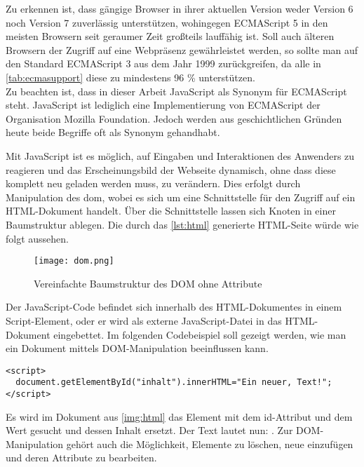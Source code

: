 Zu erkennen ist, dass gängige Browser in ihrer aktuellen Version weder Version 6 noch Version 7 zuverlässig unterstützen, wohingegen ECMAScript 5 in den meisten Browsern seit geraumer Zeit großteils lauffähig ist. Soll auch älteren Browsern der Zugriff auf eine Webpräsenz gewährleistet werden, so sollte man auf den Standard ECMAScript 3 aus dem Jahr 1999 zurückgreifen, da alle in \autoref{tab:ecmasupport} diese zu mindestens 96 \% unterstützen.\\
Zu beachten ist, dass in dieser Arbeit JavaScript als Synonym für ECMAScript steht. JavaScript ist lediglich eine Implementierung von ECMAScript der Organisation Mozilla Foundation. Jedoch werden aus geschichtlichen Gründen heute beide Begriffe oft als Synonym gehandhabt.

Mit JavaScript ist es möglich, auf Eingaben und Interaktionen des Anwenders zu reagieren und das Erscheinungsbild der Webseite dynamisch, ohne dass diese komplett neu geladen werden muss, zu verändern. Dies erfolgt durch Manipulation des \ac{dom}, wobei es sich um eine Schnittstelle für den Zugriff auf ein HTML-Dokument handelt. Über die Schnittstelle lassen sich Knoten in einer Baumstruktur ablegen. Die durch das \autoref{lst:html} generierte HTML-Seite würde wie folgt aussehen.
\begin{figure}[H]
    \begin{center}
        \texttt{[image: dom.png]}
        \caption{Vereinfachte Baumstruktur des DOM ohne Attribute}
        \label{img:dom}
    \end{center}
\end{figure}

Der JavaScript-Code befindet sich innerhalb des HTML-Dokumentes in einem Script-Element, oder er wird als externe JavaScript-Datei in das HTML-Dokument eingebettet. Im folgenden Codebeispiel soll gezeigt werden, wie man ein Dokument mittels DOM-Manipulation beeinflussen kann.

\begin{lstlisting}[style=htmlcssjs, caption=Ein JavaScript Beispiel, label=lst:javascript]
<script>
  document.getElementById("inhalt").innerHTML="Ein neuer, Text!";
</script>
\end{lstlisting}

Es wird im Dokument aus \autoref{img:html} das Element mit dem id-Attribut und dem Wert  gesucht und dessen Inhalt ersetzt. Der Text  lautet nun: . Zur DOM-Manipulation gehört auch die Möglichkeit, Elemente zu löschen, neue einzufügen und deren Attribute zu bearbeiten.\\